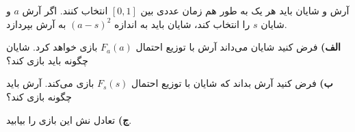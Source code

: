 آرش و شایان باید هر یک به طور هم زمان عددی بین
$[0, 1]$
انتخاب کنند. اگر آرش
$a$
و شایان
$s$
را انتخاب کند، شایان باید به اندازه
$(a - s)^2$
به آرش بپردازد.
\vspace{10pt}

\textbf{الف)}
فرض کنید شایان می‌داند آرش با توزیع احتمال
$F_a(a)$
بازی خواهد کرد. شایان چگونه باید بازی کند؟
\vspace{5pt}

\textbf{ب)}
فرض کنید آرش بداند که شایان با توزیع احتمال
$F_s(s)$
بازی می‌کند. آرش باید چگونه بازی کند؟
\vspace{5pt}

\textbf{ج)}
تعادل نش این بازی را بیابید.